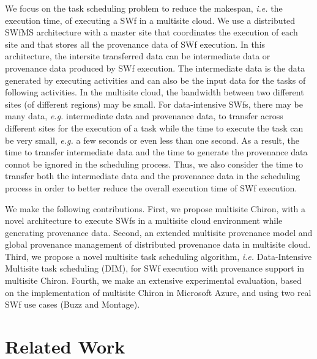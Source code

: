 We focus on the task scheduling problem to reduce the makespan, \textit{i.e.} the execution time, of executing a SWf in a multisite cloud.
We use a distributed SWfMS architecture with a master site that coordinates the execution of each site and that stores all the provenance data of SWf execution.
In this architecture, the intersite transferred data can be intermediate data or provenance data produced by SWf execution. The intermediate data is the data generated by executing activities and can also be the input data for the tasks of following activities. 
In the multisite cloud, the bandwidth between two different sites (of different regions) may be small.
For data-intensive SWfs, there may be many data, \textit{e.g.} intermediate data and provenance data, to transfer across different sites for the execution of a task while the time to execute the task can be very small, \textit{e.g.} a few seconds or even less than one second.
As a result, the time to transfer intermediate data and the time to generate the provenance data connot be ignored in the scheduling process. Thus, we also consider the time to transfer both the intermediate data and the provenance data in the scheduling process in order to better reduce the overall execution time of SWf execution.

We make the following contributions. First, we propose multisite Chiron, with a novel architecture to execute SWfs in a multisite cloud environment while generating provenance data. 
Second, an extended multisite provenance model and global provenance management of distributed provenance data in multisite cloud.
Third, we propose a novel multisite task scheduling algorithm, \textit{i.e.} Data-Intensive Multisite task scheduling (DIM), for SWf execution with provenance support in multisite Chiron.
Fourth, we make an extensive experimental evaluation, based on the implementation of multisite Chiron in Microsoft Azure, and using two real SWf use cases (Buzz and Montage).


\section{Related Work}
\label{sec:FGrw}

